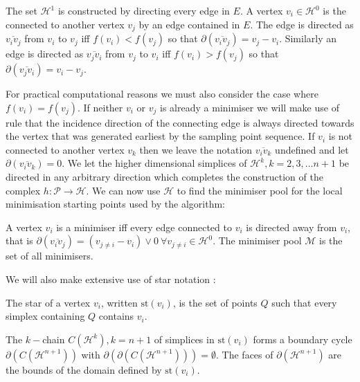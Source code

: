 
\begin{definition} \label{def:h3}
The set $\mathcal{H}^1$ is constructed by directing every edge in $E$. A vertex $v_i \in \mathcal{H}^0$ is the connected to another vertex $v_j$ by an edge contained in $E$. The edge is directed as $\overline{v_i v_j}$ from $v_i$ to $v_j$ iff $f(v_i) < f(v_j)$ so that $\partial \left( \overline{v_i v_j} \right) = v_j - v_i$. Similarly an edge is directed as $\overline{v_j v_i}$ from $v_j$ to $v_i$ iff $f(v_i) > f(v_j)$ so that $\partial \left( \overline{v_j v_i} \right) = v_i - v_j$.
\end{definition}

For practical computational reasons we must also consider the case where $f(v_i) = f(v_j)$. If neither $v_i$ or $v_j$ is already a minimiser we will make use of rule that the incidence direction of the connecting edge is always directed towards the vertex that was generated earliest by the sampling point sequence. If $v_i$ is not connected to another vertex $v_k$ then we leave the notation $\overline{v_i v_k}$ undefined and let $\partial \left(\overline{v_i v_k}\right) = 0$. We let the higher dimensional simplices of $\mathcal{H}^k, k = 2, 3, \dots n + 1$ be directed in any arbitrary direction which completes the construction of the complex $h: \mathcal{P}\rightarrow \mathcal{H}$. We can now use $\mathcal{H}$ to find the minimiser pool for the local minimisation starting points used by the algorithm:

\begin{definition} \label{def:h4}
A vertex $v_i$ is a minimiser iff every edge connected to $v_i$ is directed away from $v_i$, that is $\partial \left( \overline{v_i v_j} \right) = (v_{j \neq i} - v_i) \lor 0~ \forall v_{j \neq i} \in \mathcal{H}^0$. The minimiser pool $\mathcal{M}$ is the set of all minimisers.
\end{definition}


We will also make extensive use of star notation \cite{Hatcher2011, Henle1979}:
\begin{definition} \label{def:h5}
The star of a vertex $v_i$, written $\textrm{st}\left( v_i \right)$, is the set of points $Q$ such that every simplex containing $Q$ contains $v_i$. \
\end{definition}
The $k-$chain $C(\mathcal{H}^k), k = n + 1$ of simplices in $\textrm{st}\left( v_i \right)$ forms a boundary cycle $\partial(C(\mathcal{H}^{n + 1}))$ with $\partial\left(\partial(C(\mathcal{H}^{n + 1}))\right) = \emptyset$. The faces of $\partial(\mathcal{H}^{n + 1})$ are the bounds of the domain defined by $\textrm{st}\left( v_i \right)$.

